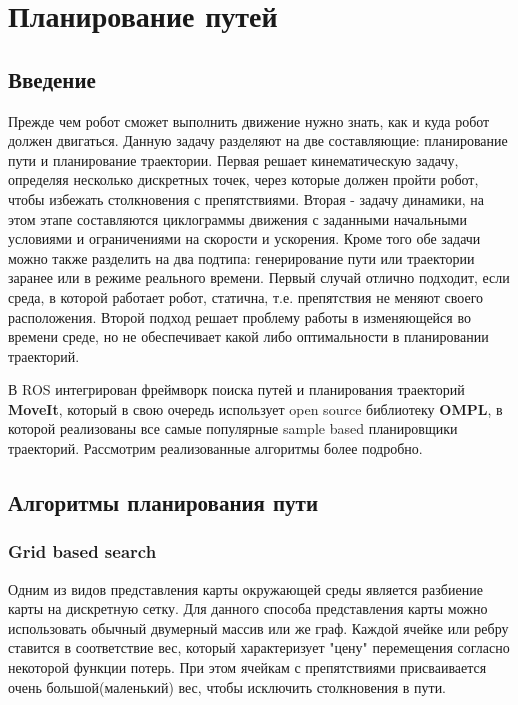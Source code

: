 \chapter{Планирование путей} \label{ch:4}


\section{Введение} \label{sect4_1}
Прежде чем робот сможет выполнить движение нужно знать, как и куда робот должен двигаться. Данную задачу разделяют на две составляющие: планирование пути и планирование траектории. Первая решает кинематическую задачу, определяя несколько дискретных точек, через которые должен пройти робот, чтобы избежать столкновения с препятствиями. Вторая - задачу динамики, на этом этапе составляются циклограммы движения с заданными начальными условиями и ограничениями на скорости и ускорения. Кроме того обе задачи можно также разделить на два подтипа: генерирование пути или траектории заранее или в режиме реального времени. Первый случай отлично подходит, если среда, в которой работает робот, статична, т.е. препятствия не меняют своего расположения. Второй подход решает проблему работы в изменяющейся во времени среде, но не обеспечивает какой либо оптимальности в планировании траекторий.

В ROS интегрирован фреймворк поиска путей и планирования траекторий \textbf{MoveIt}, который в свою очередь использует open source библиотеку \textbf{OMPL}, в которой реализованы все самые популярные sample based планировщики траекторий. Рассмотрим реализованные алгоритмы более подробно.

\section{Алгоритмы планирования пути} \label{sect4_2}
\subsection{Grid based search}\label{subsect4_2_1}
Одним из видов представления карты окружающей среды является разбиение карты на дискретную сетку. Для данного способа представления карты можно использовать обычный двумерный массив или же граф. Каждой ячейке или ребру ставится в соответствие вес, который характеризует "цену" перемещения согласно некоторой функции потерь. При этом ячейкам с препятствиями присваивается очень большой(маленький) вес, чтобы исключить столкновения в пути.

